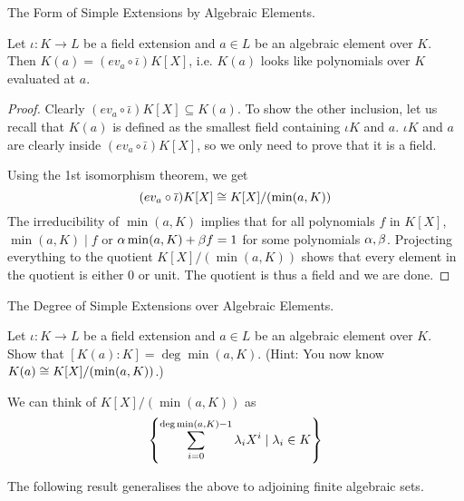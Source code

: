 \documentclass[../book.tex]{subfiles}
\begin{document}
\begin{thm} The Form of Simple Extensions by Algebraic Elements.

    Let $\iota : K \to L$ be a field extension and 
    $a \in L$ be an algebraic element over $K$. 
    Then $K(a) = (ev_a \circ\bar\iota)K[X]$,
    i.e. $K(a)$ looks like polynomials over $K$ evaluated at $a$.
\end{thm}
\begin{proof}
    Clearly $(ev_a\circ\bar\iota) K[X] \subseteq K(a)$.
    To show the other inclusion, let us recall that
    $K(a)$ is defined as the smallest field containing $\iota K$ and $a$.
    $\iota K$ and $a$ are clearly inside $(ev_a\circ\bar\iota) K[X]$,
    so we only need to prove that it is a field.
    
    Using the 1st isomorphism theorem, we get \[
        (ev_a\circ\overline{\iota}) K[X] \cong K[X]/(\min(a,K))
    \]
    The irreducibility of $\min(a,K)$ implies that 
    for all polynomials $f$ in $K[X]$, $\min(a,K) \mid f$ or 
    $\alpha \min(a,K) + \beta f = 1$ for some polynomials $\alpha, \beta$.
    Projecting everything to the quotient $K[X]/(\min(a,K))$ shows that
    every element in the quotient is either 0 or unit.
    The quotient is thus a field and we are done. 
\end{proof}
\begin{ex} The Degree of Simple Extensions over Algebraic Elements.

    Let $\iota : K \to L$ be a field extension and 
    $a \in L$ be an algebraic element over $K$. 
    Show that $[K(a):K] = \deg \min(a, K)$. 
    (Hint: You now know $K(a) \cong K[X]/(\min(a,K))$.)
\end{ex}
\begin{rmk}
    We can think of $K[X]/(\min(a,K))$ as 
    \[\displaystyle 
        \left\{\sum_{i=0}^{\deg\min(a,K) - 1} \lambda_i X^i \mid \lambda_i \in K \right\}
    \]
\end{rmk}

The following result generalises the above to adjoining finite algebraic sets.
\end{document}
